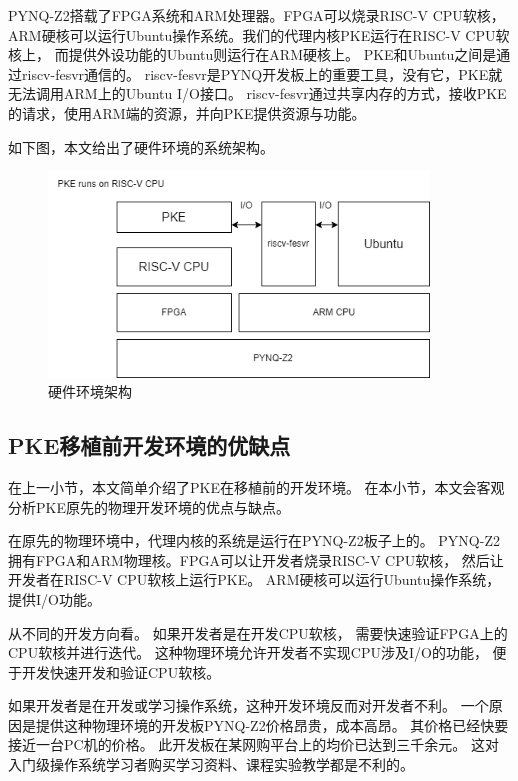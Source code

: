 PYNQ-Z2搭载了FPGA系统和ARM处理器。\cite{2019Research}FPGA可以烧录RISC-V CPU软核，
ARM硬核可以运行Ubuntu操作系统。我们的代理内核PKE运行在RISC-V CPU软核上，
而提供外设功能的Ubuntu则运行在ARM硬核上。
PKE和Ubuntu之间是通过riscv-fesvr通信的。
riscv-fesvr是PYNQ开发板上的重要工具，没有它，PKE就无法调用ARM上的Ubuntu I/O接口。
riscv-fesvr通过共享内存的方式，接收PKE的请求，使用ARM端的资源，并向PKE提供资源与功能。

如下图，本文给出了硬件环境的系统架构。

\begin{figure}[htbp]
    \vspace{13pt} %
    \centering
    \includegraphics[width=0.9\textwidth]{images/pke_hardware_env.drawio.png}
    \caption{硬件环境架构}\label{硬件环境架构} %
\end{figure}

\subsection{PKE移植前开发环境的优缺点}

在上一小节，本文简单介绍了PKE在移植前的开发环境。
在本小节，本文会客观分析PKE原先的物理开发环境的优点与缺点。

在原先的物理环境中，代理内核的系统是运行在PYNQ-Z2板子上的。
PYNQ-Z2拥有FPGA和ARM物理核。FPGA可以让开发者烧录RISC-V CPU软核，
然后让开发者在RISC-V CPU软核上运行PKE。
ARM硬核可以运行Ubuntu操作系统，提供I/O功能。\cite{1996Computer}

从不同的开发方向看。
如果开发者是在开发CPU软核，
需要快速验证FPGA上的CPU软核并进行迭代。
这种物理环境允许开发者不实现CPU涉及I/O的功能，
便于开发快速开发和验证CPU软核。

如果开发者是在开发或学习操作系统，这种开发环境反而对开发者不利。
一个原因是提供这种物理环境的开发板PYNQ-Z2价格昂贵，成本高昂。
其价格已经快要接近一台PC机的价格。
此开发板在某网购平台上的均价已达到三千余元。
这对入门级操作系统学习者购买学习资料、课程实验教学都是不利的。

